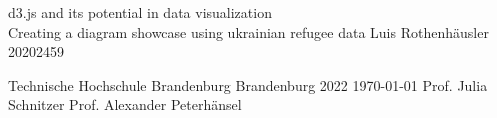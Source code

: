 \newcommand{\THBTitle}[9]{

  \thispagestyle{empty}
  \vspace*{\stretch{1}}
  {\parindent0cm
  \rule{\linewidth}{.7ex}}
  \begin{flushright}
    \vspace*{\stretch{1}}
    \sffamily\bfseries\Huge
    #1\\
    \vspace*{\stretch{1}}
    \sffamily\bfseries\large
    #2\\
    \vspace*{\stretch{1}}
    \sffamily\bfseries\small
    #3
  \end{flushright}
  \rule{\linewidth}{.7ex}

  \vspace*{\stretch{1}}
  \begin{center}
    \texttt{[image: figs/2015\_10\_05\_THB\_FB-IM\_Logo\_RGB]} \\
    \vspace*{\stretch{1}}
    \Large  Bachelorarbeit\\

    \vspace*{\stretch{2}}
   \large Fachbereich Informatik\\
    \large und Medien\\
    \large Technische Hochschule Brandenburg\\
    \vspace*{\stretch{1}}
    \large 1. Betreuerin:  #8 \\[1mm]
    \large 2. Betreuer:  #9 \\[1mm]
    
    \vspace*{\stretch{1}}
    \large Brandenburg, den #7 \\
        \vspace*{\stretch{0.25}}

    Bearbeitungszeit: 07.07.2022 - 01.09.2022 %

  \end{center}
}

\THBTitle
      {d3.js and its potential in data visualization\\
      \large Creating a diagram showcase using ukrainian refugee data}        %
      {Luis Rothenh\"ausler}                        %
      {20202459}
      
      {Technische Hochschule Brandenburg}  %
      {Brandenburg 2022}                          %
      {\today{}}                              %
      {Prof. Julia Schnitzer}               %
      {Prof. Alexander Peterhänsel}                          %